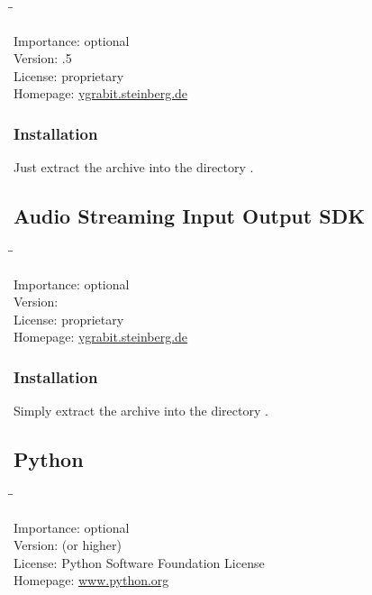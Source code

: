 \begin{tabbing}
  \hspace*{6em}\=\=\kill

  Importance:  \> optional \\
  Version:     .5 \\
  License:     \> proprietary \\
  Homepage:    \> \href{http://ygrabit.steinberg.de/}{ygrabit.steinberg.de}
\end{tabbing}

\subsubsection{Installation}

Just extract the archive into the directory
.

\subsection{Audio Streaming Input Output SDK}

\begin{tabbing}
  \hspace*{6em}\=\=\kill

  Importance:  \> optional \\
  Version:      \\
  License:     \> proprietary \\
  Homepage:    \> \href{http://ygrabit.steinberg.de/}{ygrabit.steinberg.de}
\end{tabbing}

\subsubsection{Installation}

Simply extract the archive into the directory
.

\subsection{Python}

\begin{tabbing}
  \hspace*{6em}\=\=\kill

  Importance:  \> optional \\
  Version:      (or higher) \\
  License:     \> Python Software Foundation License \\
  Homepage:    \> \href{http://www.python.org/}{www.python.org}
\end{tabbing}


